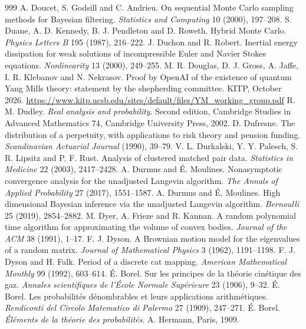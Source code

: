 \begin{thebibliography}{999}
 A. Doucet, S. Godsill and C. Andrieu. On sequential Monte Carlo sampling methods for Bayesian filtering. \emph{Statistics and Computing} 10 (2000), 197--208.
 S. Duane, A. D. Kennedy, B. J. Pendleton and D. Roweth. Hybrid Monte Carlo. \emph{Physics Letters B} 195 (1987), 216--222.
 J. Duchon and R. Robert. Inertial energy dissipation for weak solutions of incompressible Euler and Navier Stokes equations. \emph{Nonlinearity} 13 (2000), 249--255.
 M. R. Douglas, D. J. Gross, A. Jaffe, I. R. Klebanov and N. Nekrasov. Proof by OpenAI of the existence of quantum Yang Mills theory: statement by the shepherding committee. KITP, October 2026. \url{https://www.kitp.ucsb.edu/sites/default/files/YM_working_group.pdf}
 R. M. Dudley. \emph{Real analysis and probability}. Second edition, Cambridge Studies in Advanced Mathematics 74, Cambridge University Press, 2002.
 D. Dufresne. The distribution of a perpetuity, with applications to risk theory and pension funding. \emph{Scandinavian Actuarial Journal} (1990), 39--79.
 V. L. Durkalski, Y. Y. Palesch, S. R. Lipsitz and P. F. Rust. Analysis of clustered matched pair data. \emph{Statistics in Medicine} 22 (2003), 2417--2428.
 A. Durmus and \'E. Moulines. Nonasymptotic convergence analysis for the unadjusted Langevin algorithm. \emph{The Annals of Applied Probability} 27 (2017), 1551--1587.
 A. Durmus and \'E. Moulines. High dimensional Bayesian inference via the unadjusted Langevin algorithm. \emph{Bernoulli} 25 (2019), 2854--2882.
 M. Dyer, A. Frieze and R. Kannan. A random polynomial time algorithm for approximating the volume of convex bodies. \emph{Journal of the ACM} 38 (1991), 1--17.
 F. J. Dyson. A Brownian motion model for the eigenvalues of a random matrix. \emph{Journal of Mathematical Physics} 3 (1962), 1191--1198.
 F. J. Dyson and H. Falk. Period of a discrete cat mapping. \emph{American Mathematical Monthly} 99 (1992), 603--614.
 \'E. Borel. Sur les principes de la th\'eorie cin\'etique des gaz. \emph{Annales scientifiques de l'\'Ecole Normale Sup\'erieure} 23 (1906), 9--32.
 \'E. Borel. Les probabilit\'es d\'enombrables et leurs applications arithm\'etiques. \emph{Rendiconti del Circolo Matematico di Palermo} 27 (1909), 247--271.
 \'E. Borel. \emph{\'El\'ements de la th\'eorie des probabilit\'es}. A. Hermann, Paris, 1909.

\end{thebibliography}
